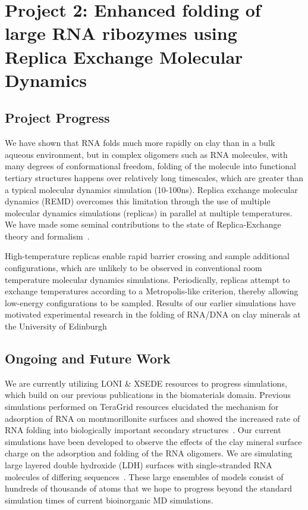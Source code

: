 \documentclass[a4paper,11pt]{article}
\begin{document}
\section{Project 2: Enhanced folding of large RNA ribozymes using Replica Exchange Molecular Dynamics}

\subsection{Project Progress}

We have shown that RNA folds much more rapidly on clay than in a bulk aqueous environment, but in complex oligomers such as RNA molecules, with many degrees of conformational freedom, folding of the molecule into functional tertiary structures happens over relatively long timescales, which are greater than a typical molecular dynamics simulation (10-100ns). Replica exchange molecular dynamics (REMD) overcomes this limitation through the use of multiple molecular dynamics simulations (replicas) in parallel at multiple temperatures.  We have made some seminal contributions to the state of Replica-Exchange theory and formalism~\cite{async_repex11, Luckow:2008la,luckow2009adaptive}.

High-temperature replicas enable rapid barrier crossing and sample additional configurations, which are unlikely to be observed in conventional room temperature molecular dynamics simulations. Periodically, replicas attempt to exchange temperatures according to a Metropolis-like criterion, thereby allowing low-energy configurations to be sampled. Results of our earlier simulations have motivated experimental research in the folding of RNA/DNA on clay minerals at the University of Edinburgh

\subsection{Ongoing and Future Work}
We are currently utilizing LONI \& XSEDE resources to progress simulations, which build on our previous publications in the biomaterials domain. Previous simulations performed on TeraGrid resources elucidated the mechanism for adsorption of RNA on montmorillonite surfaces and showed the increased rate of RNA folding into biologically important secondary structures~\cite{Ref9}. Our current simulations have been developed to observe the effects of the clay mineral surface charge on the adsorption and folding of the RNA oligomers. We are simulating large layered double hydroxide (LDH) surfaces with single-stranded RNA molecules of differing sequences~\cite{Ref10}. These large ensembles of models consist of hundreds of thousands of atoms that we hope to progress beyond the standard simulation times of current bioinorganic MD simulations.
\end{document}
